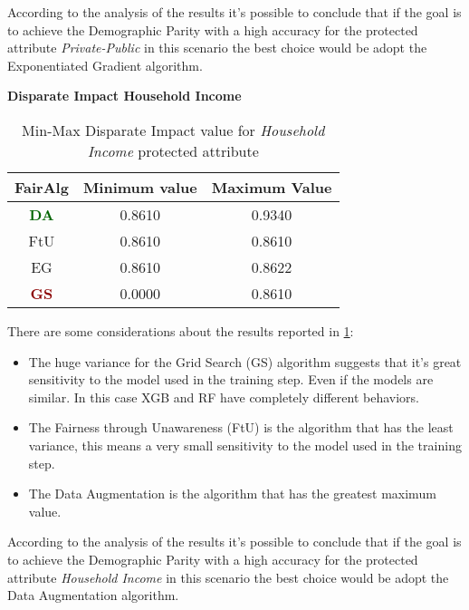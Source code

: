 According to the analysis of the results it's possible to conclude that if the goal is to achieve the Demographic Parity with a high accuracy for the protected attribute \emph{Private-Public} in this scenario the best choice would be adopt the Exponentiated Gradient algorithm.

\textbf{Disparate Impact Household Income}
\begin{table}
    \centering
    \begin{tabular}{|c|c|c|}
        \hline
        \textbf{FairAlg} & \textbf{Minimum value} & \textbf{Maximum Value} \\
        \hline
        \textcolor{darkgreen}{\textbf{DA}} & 0.8610 & 0.9340 \\
        \hline
        FtU & 0.8610 & 0.8610 \\
        \hline
        EG & 0.8610 & 0.8622 \\
        \hline
        \textcolor{darkred}{\textbf{GS}} & 0.0000 & 0.8610 \\
        \hline
    \end{tabular}
    \caption{Min-Max Disparate Impact value for \emph{Household Income} protected attribute}
    \label{tab:h_di}
\end{table}

There are some considerations about the results reported in \cref{tab:h_di}:

\begin{itemize}

    \item The huge variance for the Grid Search (GS) algorithm suggests that it's great sensitivity to the model used in the training step. Even if the models are similar. In this case XGB and RF have completely different behaviors.

    \item The Fairness through Unawareness (FtU) is the algorithm that has the least variance, this means a very small sensitivity to the model used in the training step.

    \item The Data Augmentation is the algorithm that has the greatest maximum value.

\end{itemize}

According to the analysis of the results it's possible to conclude that if the goal is to achieve the Demographic Parity with a high accuracy for the protected attribute \emph{Household Income} in this scenario the best choice would be adopt the Data Augmentation algorithm.

